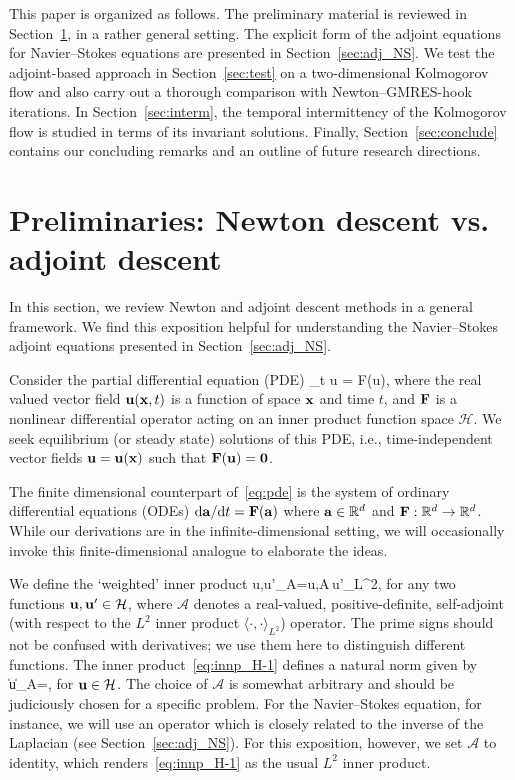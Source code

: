 \documentclass{jfm}
\begin{document}
This paper is organized as follows. The preliminary material is reviewed in
Section~\ref{sec:prelim}, in a rather general setting. The explicit form of the
adjoint equations for Navier--Stokes equations are presented in
Section~\ref{sec:adj_NS}. We test the adjoint-based approach in Section~\ref{sec:test}
on a two-dimensional Kolmogorov flow
and also carry out a thorough comparison with Newton--GMRES-hook iterations.
In Section~\ref{sec:interm}, the temporal intermittency of the Kolmogorov flow is
studied in terms of its invariant solutions. Finally, Section~\ref{sec:conclude} contains
our concluding remarks and an outline of future research directions.

\section{Preliminaries: Newton descent vs. adjoint descent}\label{sec:prelim}
In this section, we review Newton and adjoint descent methods
in a general framework.
We find this exposition helpful for
understanding the Navier--Stokes adjoint
equations presented in Section~\ref{sec:adj_NS}.

Consider the partial differential equation (PDE)
\beq
\partial_t \vc u = \vc F(\vc u),
\label{eq:pde}
\eeq
where the real valued vector field
$\mathbf u(\mathbf x,t)$ is a function of space $\mathbf x$ and time $t$, and
$\mathbf F$ is a nonlinear differential operator acting on an inner product function space
$\mathcal H$. We seek equilibrium (or steady state) solutions of this PDE, i.e.,
time-independent vector fields $\mathbf u=\mathbf u(\mathbf x)$ such that $\mathbf F(\mathbf u)=\mathbf 0$.

The finite dimensional counterpart of~\eqref{eq:pde} is the system of ordinary differential
equations (ODEs) $\mbox d\mathbf a/\mbox d t=\mathbf F(\mathbf a)$ where $\mathbf a\in\mathbb R^d$ and
$\mathbf F:\mathbb R^d\to\mathbb R^d$. While our derivations are in the infinite-dimensional setting,
we will occasionally invoke this finite-dimensional analogue to elaborate the ideas.

We define the `weighted' inner product
\beq
\langle \vc u,\vc u'\rangle_{\mathcal A}=\langle \vc u,\mathcal A\,\vc u'\rangle_{L^2},
\label{eq:innp_H-1}
\eeq
for any two functions $\mathbf u,\mathbf u'\in\mathcal H$,
where $\mathcal A$ denotes a real-valued, positive-definite, self-adjoint (with respect to the $L^2$
inner product $\langle\cdot,\cdot\rangle_{L^2}$) operator.
The prime signs should not be confused with derivatives; we use them here
to distinguish different functions.
The inner product~\eqref{eq:innp_H-1} defines a natural norm given by
\beq
\|\vc u\|_{\mathcal A}=,
\label{eq:normA}
\eeq
for $\mathbf u\in\mathcal H$.
The choice of $\mathcal A$ is somewhat arbitrary and 
should be judiciously chosen for a specific
problem. For the Navier--Stokes equation, for instance, we will use an operator
which is closely related to the inverse of the Laplacian (see Section~\ref{sec:adj_NS}).
For this exposition, however, we set $\mathcal A$ to identity, which renders~\eqref{eq:innp_H-1}
as the usual $L^2$ inner product.
\end{document}
